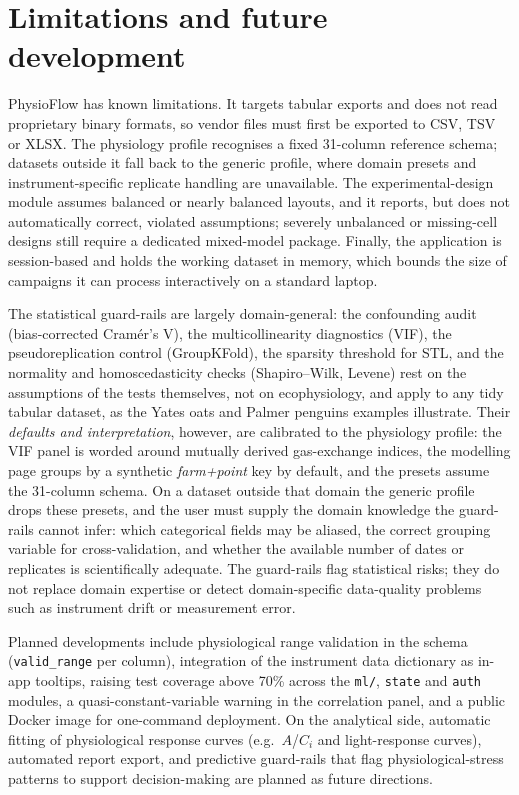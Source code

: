\documentclass[11pt, letterpaper]{article}
\begin{document}
\section{Limitations and future development}\label{sec:future}

PhysioFlow has known limitations. It targets tabular exports and does not read proprietary binary formats, so vendor files must first be exported to CSV, TSV or XLSX. The physiology profile recognises a fixed 31-column reference schema; datasets outside it fall back to the generic profile, where domain presets and instrument-specific replicate handling are unavailable. The experimental-design module assumes balanced or nearly balanced layouts, and it reports, but does not automatically correct, violated assumptions; severely unbalanced or missing-cell designs still require a dedicated mixed-model package. Finally, the application is session-based and holds the working dataset in memory, which bounds the size of campaigns it can process interactively on a standard laptop.

The statistical guard-rails are largely domain-general: the confounding audit (bias-corrected Cram\'er's V), the multicollinearity diagnostics (VIF), the pseudoreplication control (GroupKFold), the sparsity threshold for STL, and the normality and homoscedasticity checks (Shapiro--Wilk, Levene) rest on the assumptions of the tests themselves, not on ecophysiology, and apply to any tidy tabular dataset, as the Yates oats and Palmer penguins examples illustrate. Their \emph{defaults and interpretation}, however, are calibrated to the physiology profile: the VIF panel is worded around mutually derived gas-exchange indices, the modelling page groups by a synthetic \emph{farm+point} key by default, and the presets assume the 31-column schema. On a dataset outside that domain the generic profile drops these presets, and the user must supply the domain knowledge the guard-rails cannot infer: which categorical fields may be aliased, the correct grouping variable for cross-validation, and whether the available number of dates or replicates is scientifically adequate. The guard-rails flag statistical risks; they do not replace domain expertise or detect domain-specific data-quality problems such as instrument drift or measurement error.

Planned developments include physiological range validation in the schema (\texttt{valid\_range} per column), integration of the instrument data dictionary as in-app tooltips, raising test coverage above 70\% across the \texttt{ml/}, \texttt{state} and \texttt{auth} modules, a quasi-constant-variable warning in the correlation panel, and a public Docker image for one-command deployment. On the analytical side, automatic fitting of physiological response curves (e.g.\ $A$/$C_i$ and light-response curves), automated report export, and predictive guard-rails that flag physiological-stress patterns to support decision-making are planned as future directions.
\end{document}
